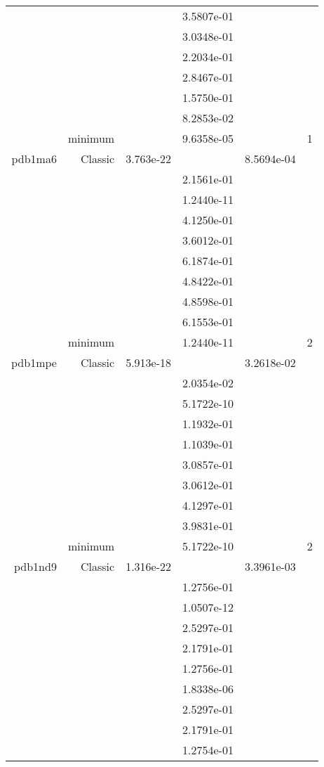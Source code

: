 \begin{xltabular}{\textwidth}{r|rS[table-format=1.3e+2]S[table-format=1.4e+2]S[table-format=1.4e+2]S[table-format=-1.5]}
&  &  & 3.5807e-01 & & \\
&  &  & 3.0348e-01 & & \\
&  &  & 2.2034e-01 & & \\
&  &  & 2.8467e-01 & & \\
&  &  & 1.5750e-01 & & \\
&  &  & 8.2853e-02 & & \\
& minimum &  & 9.6358e-05 & & 1 \\  \addlinespace
pdb1ma6 & Classic & 3.763e-22 &  & 8.5694e-04 & \\
&  &  & 2.1561e-01 & & \\
&  &  & 1.2440e-11 & & \\
&  &  & 4.1250e-01 & & \\
&  &  & 3.6012e-01 & & \\
&  &  & 6.1874e-01 & & \\
&  &  & 4.8422e-01 & & \\
&  &  & 4.8598e-01 & & \\
&  &  & 6.1553e-01 & & \\
& minimum &  & 1.2440e-11 & & 2 \\  \addlinespace
pdb1mpe & Classic & 5.913e-18 &  & 3.2618e-02 & \\
&  &  & 2.0354e-02 & & \\
&  &  & 5.1722e-10 & & \\
&  &  & 1.1932e-01 & & \\
&  &  & 1.1039e-01 & & \\
&  &  & 3.0857e-01 & & \\
&  &  & 3.0612e-01 & & \\
&  &  & 4.1297e-01 & & \\
&  &  & 3.9831e-01 & & \\
& minimum &  & 5.1722e-10 & & 2 \\  \addlinespace
pdb1nd9 & Classic & 1.316e-22 &  & 3.3961e-03 & \\
&  &  & 1.2756e-01 & & \\
&  &  & 1.0507e-12 & & \\
&  &  & 2.5297e-01 & & \\
&  &  & 2.1791e-01 & & \\
&  &  & 1.2756e-01 & & \\
&  &  & 1.8338e-06 & & \\
&  &  & 2.5297e-01 & & \\
&  &  & 2.1791e-01 & & \\
&  &  & 1.2754e-01 & & \\

\end{xltabular}
